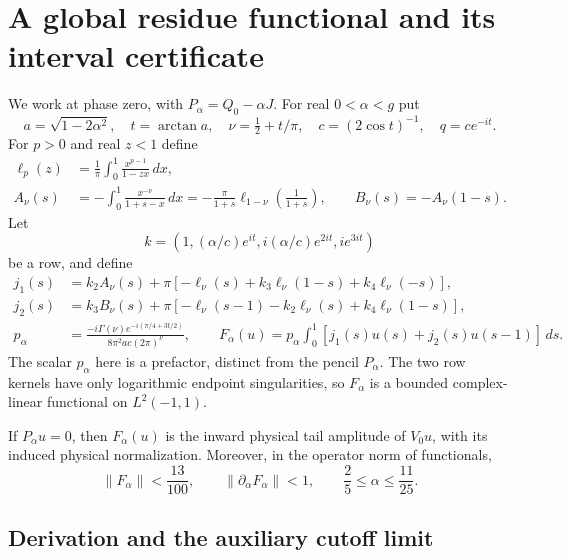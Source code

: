 \section{A global residue functional and its interval certificate}
\label{boundary:app:residue:rr}

We work at phase zero, with $P_\alpha=Q_0-\alpha J$.
For real $0<\alpha<g$ put
\[
 a=\sqrt{1-2\alpha^2},\quad t=\arctan a,\quad
 \nu=\tfrac12+t/\pi,\quad c=(2\cos t)^{-1},\quad q=ce^{-it}.
\]
For $p>0$ and real $z<1$ define
\begin{align}
 \ell_p(z)&=\frac1\pi\int_0^1\frac{x^{p-1}}{1-zx}\,dx,
 \nonumber\\
 A_\nu(s)&=-\int_0^1\frac{x^{-\nu}}{1+s-x}\,dx
   =-\frac\pi{1+s}\ell_{1-\nu}\!\left(\frac1{1+s}\right),
 \qquad B_\nu(s)=-A_\nu(1-s).
 \label{boundary:eq:residue-scalar-kernels:rr}
\end{align}
Let
\[
 k=(1,(\alpha/c)e^{it},i(\alpha/c)e^{2it},ie^{3it})
\]
be a row, and define
\begin{align}
 j_1(s)&=k_2A_\nu(s)+\pi[-\ell_\nu(s)
                  +k_3\ell_\nu(1-s)+k_4\ell_\nu(-s)],\nonumber\\
 j_2(s)&=k_3B_\nu(s)+\pi[-\ell_\nu(s-1)
                  -k_2\ell_\nu(s)+k_4\ell_\nu(1-s)],\nonumber\\
 p_\alpha&=\frac{-i\Gamma(\nu)e^{-i(\pi/4+3t/2)}}
                  {8\pi^2ac(2\pi)^\nu},\qquad
 F_\alpha(u)=p_\alpha\int_0^1
                [j_1(s)u(s)+j_2(s)u(s-1)]\,ds.
 \label{boundary:eq:global-residue-functional:rr}
\end{align}
The scalar $p_\alpha$ here is a prefactor, distinct from the pencil
$P_\alpha$.  The two row kernels have only logarithmic endpoint
singularities, so $F_\alpha$ is a bounded complex-linear functional
on $L^2(-1,1)$.

\begin{lemma}
\label{boundary:lem:global-residue:rr}
If $P_\alpha u=0$, then $F_\alpha(u)$ is the inward physical tail
amplitude of $V_0u$, with its induced physical normalization.
Moreover, in the operator norm of functionals,
\begin{equation}\label{boundary:eq:uniform-residue-bounds:rr}
 \|F_\alpha\|<\frac{13}{100},\qquad
 \|\partial_\alpha F_\alpha\|<1,
 \qquad \frac25\le\alpha\le\frac{11}{25}.
\end{equation}
\end{lemma}

\subsection{Derivation and the auxiliary cutoff limit}

